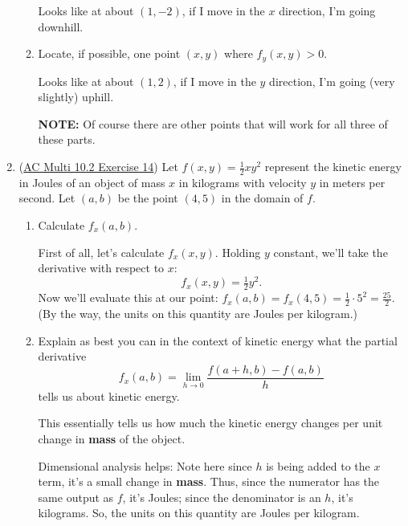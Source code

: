 \begin{enumerate}[leftmargin=0pt]
\begin{enumerate}
    \begin{red}
    Looks like at about $(1,-2)$, if I move in the $x$ direction, I'm going downhill.
    \end{red}
    
    \item Locate, if possible, one point $(x,y)$ where $f_y(x,y)>0$.
    
    \begin{red}
    Looks like at about $(1,2)$, if I move in the $y$ direction, I'm going (very slightly) uphill.
    
    \textbf{NOTE:} Of course there are other points that will work for all three of these parts.
    \end{red}

\end{enumerate}

\item (\href{https://activecalculus.org/multi/S-10-2-First-Order-Partial-Derivatives.html#Ez_10_2_1_5}{AC Multi 10.2 Exercise 14}) Let $f(x, y) = \tfrac{1}{2}xy^2$ represent the kinetic energy in Joules of an object of mass $x$ in kilograms with velocity $y$ in meters per second. Let $(a, b)$ be the point $(4,5)$ in the domain of $f$.
    \begin{enumerate}
        \item Calculate $f_x(a,b)$.
        
        \begin{red}
            First of all, let's calculate $f_x(x,y).$ Holding $y$ constant, we'll take the derivative with respect to $x$:
            \[f_x(x,y) = \tfrac{1}{2}y^2.\]
            Now we'll evaluate this at our point: $f_x(a, b) = f_x(4, 5) = \tfrac{1}{2}\cdot 5^2 = \tfrac{25}{2}.$
            (By the way, the units on this quantity are Joules per kilogram.)
        \end{red}
        \item Explain as best you can in the context of kinetic energy what the partial derivative
        \[f_{x}(a, b)=\lim _{h \rightarrow 0} \frac{f(a+h, b)-f(a, b)}{h}\]
        tells us about kinetic energy.
        
        \begin{red}
            This essentially tells us how much the kinetic energy changes per unit change in \textbf{mass} of the object. 
            
            Dimensional analysis helps: Note here since $h$ is being added to the $x$ term, it's a small change in \textbf{mass}. Thus, since the numerator has the same output as $f$, it's Joules; since the denominator is an $h$, it's kilograms. So, the units on this quantity are Joules per kilogram.
        \end{red}
        

\end{enumerate}
\end{enumerate}
